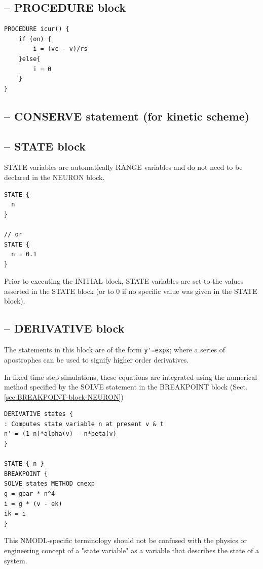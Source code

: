 \subsection{-- PROCEDURE block}

\begin{verbatim}
PROCEDURE icur() {
	if (on) {
		i = (vc - v)/rs
	}else{
		i = 0
	}
}
\end{verbatim}


\subsection{-- CONSERVE statement (for kinetic scheme)}

\subsection{-- STATE block}
\label{sec:STATE-block-NEURON}


STATE variables are automatically RANGE variables and do not need to be declared
in the NEURON block.
\begin{verbatim}
STATE {
  n
}

// or 
STATE {
  n = 0.1
}
\end{verbatim}
Prior to executing the INITIAL block, STATE variables are set to the values
asserted in the STATE block (or to 0 if no specific value was given in the STATE
block).

\subsection{-- DERIVATIVE block}
\label{sec:DERIVATIVE-block-NEURON}


The statements in this block are of the form \verb!y'=expx!;
where a series of apostrophes can be used to signify higher order derivatives.

In fixed time step simulations, these equations are integrated using the
numerical method specified by the SOLVE statement in the BREAKPOINT block
(Sect.\ref{sec:BREAKPOINT-block-NEURON})

\begin{verbatim}
DERIVATIVE states {
: Computes state variable n at present v & t
n' = (1-n)*alpha(v) - n*beta(v)
}

STATE { n }
BREAKPOINT {
SOLVE states METHOD cnexp
g = gbar * n^4
i = g * (v - ek)
ik = i
}
\end{verbatim}
This NMODL-specific terminology should not be
confused with the physics or engineering concept of a "state variable" as a variable
that describes the state of a system.

